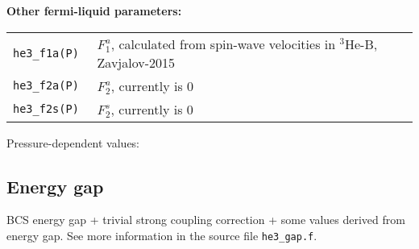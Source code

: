\documentclass[a4paper]{article}
\begin{document}
{\bf Other fermi-liquid parameters:}

\medskip
\noindent\begin{tabular}{lp{11cm}}
\tt he3\_f1a(P)    &$F_1^a$, calculated from
                    spin-wave velocities in $^3$He-B, Zavjalov-2015\\
\tt he3\_f2a(P)    &$F_2^a$, currently is 0\\
\tt he3\_f2s(P)    &$F_2^s$, currently is 0\\
\end{tabular}
\medskip

\eject
Pressure-dependent values:
\medskip

{\small}

\eject
\subsection*{Energy gap}

BCS energy gap + trivial strong coupling correction + some values
derived from energy gap. See more information in the
source file {\tt he3\_gap.f}.
\end{document}
